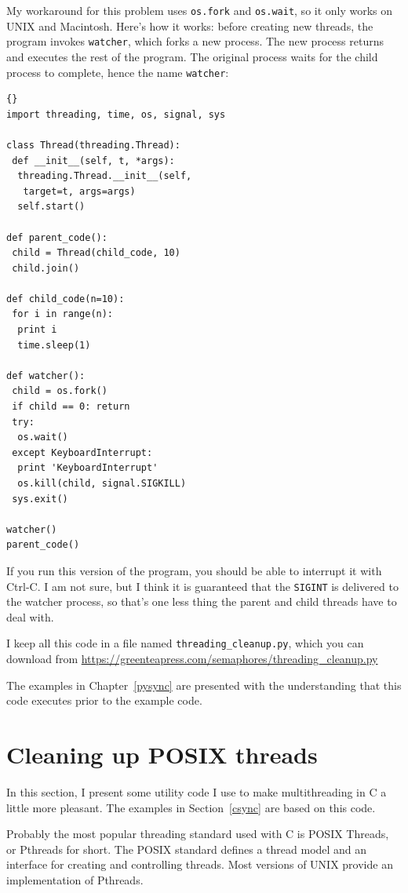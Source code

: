 \documentclass{book}
\begin{document}
My workaround for this problem uses {\tt os.fork} and {\tt os.wait},
so it only works on UNIX and Macintosh.  Here's how it works:
before creating new threads, the program invokes {\tt watcher},
which forks a new process.  The new process returns and executes
the rest of the program.  The original process waits for the
child process to complete, hence the name {\tt watcher}:

\begin{lstlisting}[title={The watcher}]{}
import threading, time, os, signal, sys

class Thread(threading.Thread):
 def __init__(self, t, *args):
  threading.Thread.__init__(self, 
   target=t, args=args)
  self.start()

def parent_code():
 child = Thread(child_code, 10)
 child.join()

def child_code(n=10):
 for i in range(n):
  print i
  time.sleep(1)

def watcher():
 child = os.fork()
 if child == 0: return
 try:
  os.wait()
 except KeyboardInterrupt:
  print 'KeyboardInterrupt'
  os.kill(child, signal.SIGKILL)
 sys.exit()

watcher()
parent_code()
\end{lstlisting}

If you run this version of the program, you should be able
to interrupt it with Ctrl-C.  I am not sure, but I think it
is guaranteed that the {\tt SIGINT} is delivered to the
watcher process, so that's one less thing the
parent and child threads have to deal with.

I keep all this code in a file named {\tt threading\_cleanup.py}, which you can download from {\scriptsize\url{https://greenteapress.com/semaphores/threading\_cleanup.py}}


The examples in Chapter~\ref{pysync} are presented with the understanding
that this code executes prior to the example code.


\chapter{Cleaning up POSIX threads}
\label{ccleanup}

In this section, I present some utility code I use to make
multithreading in C a little more pleasant.  The examples in
Section~\ref{csync} are based on this code.

Probably the most popular threading standard used with C is
POSIX Threads, or Pthreads for short.  The POSIX standard defines
a thread model and an interface for creating and controlling
threads.  Most versions of UNIX provide an implementation of
Pthreads.
\end{document}
